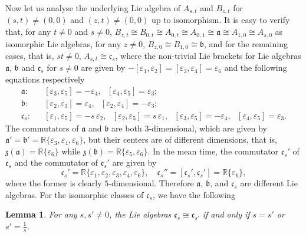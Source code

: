 \documentclass{amsart}
\numberwithin{equation}{section}
\newtheorem{lemma}  [theorem]     {Lemma}
\theoremstyle{definition}
\renewcommand{\1}{\mathds{1}}
\renewcommand{\>}{\rightarrow}
\begin{document}
Now let us analyse the underlying Lie algebra of $A_{s,t}$ and $B_{z,t}$ for $(s,t) \neq (0,0)$ and $(z,t) \neq (0,0)$ up to isomorphism.
It is easy to verify that, for any $t\neq 0$ and $s \neq 0$, $B_{z,t} \cong B_{0,t} \cong A_{0,t} \cong A_{0,1}
\cong {\mathfrak a} \cong A_{1,0} \cong A_{s,0}$ as isomorphic Lie algebras, for any $z\neq 0$, $B_{z,0} \cong B_{1,0} \cong {\mathfrak b}$,
and for the remaining cases, that is, $st\neq 0$, $A_{s,t} \cong {\mathfrak c}_s$, where the non-trivial Lie brackets for Lie algebras ${\mathfrak a}$, ${\mathfrak b}$ and ${\mathfrak c}_s$ for $s\neq 0$ are given by $-[\varepsilon_1, \varepsilon_2] = [\varepsilon_3, \varepsilon_4] = \varepsilon_6$ and the following equations respectively
\begin{eqnarray}
{\mathfrak a}: &&  [\varepsilon_3, \varepsilon_5] = -\varepsilon_4, \ \ \ [\varepsilon_4, \varepsilon_5] =  \varepsilon_3;   \nonumber \\
{\mathfrak b}: &&  [\varepsilon_2, \varepsilon_3] = \varepsilon_4, \ \ \ [\varepsilon_2, \varepsilon_4] =  -\varepsilon_3;   \nonumber \\
{\mathfrak c}_s: &&  [\varepsilon_1, \varepsilon_5] = -s\, \varepsilon_2, \ \ \ [\varepsilon_2, \varepsilon_5] =  s\, \varepsilon_1, \ \ \  [\varepsilon_3, \varepsilon_5] = - \varepsilon_4 , \ \ \  [\varepsilon_4, \varepsilon_5] =  \varepsilon_3. \nonumber
\end{eqnarray}
The commutators of ${\mathfrak a}$ and ${\mathfrak b}$ are both $3$-dimensional, which are given by ${\mathfrak a}' = {\mathfrak b}'={\mathbb R}\{ \varepsilon_3, \varepsilon_4, \varepsilon_6\} $, but their centers are of different dimensions, that is, ${\mathfrak z}({\mathfrak a})={\mathbb R}\{ \varepsilon_6\}$ while ${\mathfrak z}({\mathfrak b})={\mathbb R}\{ \varepsilon_5, \varepsilon_6\}$. In the mean time, the commutator $\mathfrak{c}_s'$ of ${\mathfrak c}_s$ and the commutator of $\mathfrak{c}_s'$ are given by
$$ {\mathfrak c}_s' = {\mathbb R}\{ \varepsilon_1,  \varepsilon_2, \varepsilon_3,  \varepsilon_4,\varepsilon_6\},\quad
 {\mathfrak c}_s'' =[{\mathfrak c}_s',{\mathfrak c}_s']= {\mathbb R}\{\varepsilon_6\},$$
where the former is clearly $5$-dimensional. Therefore ${\mathfrak a}$, ${\mathfrak b}$, and ${\mathfrak c}_s$ are different Lie algebras. 
For the isomorphic classes of $\mathfrak{c}_s$, we have the following

\begin{lemma}
For any $s,s'\neq0$, the Lie algebras ${\mathfrak c}_s \cong {\mathfrak c}_{s'}$ if and only if $s=s'$ or $s'=\frac{1}{s}$.
\end{lemma}
\end{document}
